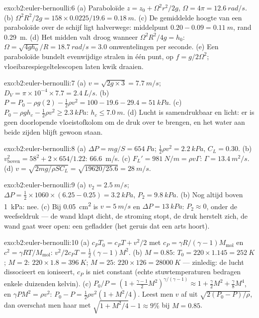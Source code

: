 \begin{solution}{exo:b2:euler-bernoulli:6}
(a) Paraboloïde $z = z_0 + \Omega^2r^2/2g$,
$\Omega = 4\pi = \qty{12.6}{rad/s}$. (b)
$\Omega^2R^2/2g = 158 \times 0.0225/19.6 = \qty{0.18}{m}$. (c) De gemiddelde
hoogte van een paraboloïde over de schijf ligt halverwege: middelpunt
$0.20 - 0.09 = \qty{0.11}{m}$, rand \qty{0.29}{m}. (d) Het midden valt droog
wanneer $\Omega^2R^2/4g = h_0$:
$\Omega = \sqrt{4gh_0}/R =
\qty{18.7}{rad/s} = 3.0$ omwentelingen per
seconde. (e) Een paraboloïde bundelt evenwijdige stralen in één punt, op
$f = g/2\Omega^2$; vloeibarespiegeltelescopen laten kwik draaien.
\end{solution}

\begin{solution}{exo:b2:euler-bernoulli:7}
(a) $v = \sqrt{2g \times 3} = \qty{7.7}{m/s}$;
$D_V = \pi \times 10^{-4} \times 7.7 =
\qty{2.4}{L/s}$. (b)
$P = P_0 - \rho g(2) - \tfrac12\rho v^2 = 100 - 19.6 - 29.4 =
\qty{51}{kPa}$.
(c) $P_0 - \rho gh_c - \tfrac12\rho v^2 \ge \qty{2.3}{kPa}$:
$h_c \le
\qty{7.0}{m}$. (d) Lucht is samendrukbaar en licht: er is geen
doorlopende vloeistofkolom om de druk over te brengen, en het water aan
beide zijden blijft gewoon staan.
\end{solution}

\begin{solution}{exo:b2:euler-bernoulli:8}
(a) $\Delta P = mg/S = \qty{654}{Pa}$; $\tfrac12\rho v^2 = \qty{2.2}{kPa}$,
$C_L = 0.30$. (b) $v_{\text{boven}}^2 = 58^2 + 2 \times 654/1.22$:
\qty{66.6}{m/s}. (c) $F_L' =
\qty{981}{N/m} = \rho v\Gamma$:
$\Gamma = \qty{13.4}{m^2/s}$. (d)
$v = \sqrt{2mg/
\rho SC_L} = \sqrt{19620/25.6} = \qty{28}{m/s}$.
\end{solution}

\begin{solution}{exo:b2:euler-bernoulli:9}
(a) $v_2 = \qty{2.5}{m/s}$;
$\Delta P = \tfrac12 \times 1060 \times (6.25 - 0.25) =
\qty{3.2}{kPa}$,
$P_2 = \qty{9.8}{kPa}$. (b) Nog altijd boven \qty{1}{kPa}: nee. (c) Bij
\qty{0.05}{cm^2} is $v = \qty{5}{m/s}$ en $\Delta P = \qty{13}{kPa}$:
$P_2 \approx 0$, onder de weefseldruk --- de wand klapt dicht, de stroming
stopt, de druk herstelt zich, de wand gaat weer open: een gefladder (het
geruis dat een arts hoort).
\end{solution}

\begin{solution}{exo:b2:euler-bernoulli:10}
(a) $c_PT_0 = c_PT + v^2/2$ met $c_P = \gamma R/(\gamma - 1)M_{\text{mol}}$
en $c^2 = \gamma RT/M_{\text{mol}}$: $v^2/2c_PT = \tfrac12(\gamma - 1)M^2$.
(b) $M =
0.85$: $T_0 = 220 \times 1.145 = \qty{252}{K}$; $M = 2$:
$220 \times 1.8 = \qty{396}{K}$; $M = 25$: $220 \times 126 = \qty{28000}{K}$
--- zinledig: de lucht dissocieert en ioniseert, $c_P$ is niet constant
(echte stuwtemperaturen bedragen enkele duizenden kelvin). (c)
$P_0/P = (1 + \tfrac{\gamma - 1}2M^2)^{\gamma/(\gamma
- 1)} \approx 1 + \tfrac{\gamma}2M^2 + \tfrac{\gamma}8M^4$,
en $\gamma PM^2 = \rho v^2$: $P_0 - P = \tfrac12\rho v^2(1 + M^2/4)$. Leest
men $v$ af uit $\sqrt{2(P_0 - P)/\rho}$, dan overschat men haar met
$\sqrt{1 + M^2/4} - 1 \approx 9\%$ bij $M = 0.85$.
\end{solution}


